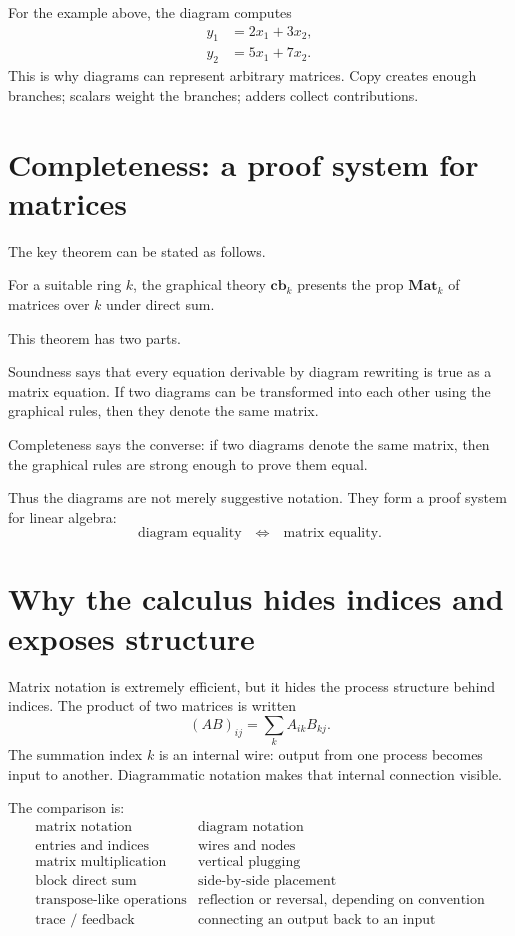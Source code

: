 For the example above, the diagram computes
\[
\begin{aligned}
  y_1&=2x_1+3x_2,\\
  y_2&=5x_1+7x_2.
\end{aligned}
\]
This is why diagrams can represent arbitrary matrices.  Copy creates enough branches; scalars weight the branches; adders collect contributions.

\section{Completeness: a proof system for matrices}

The key theorem can be stated as follows.

\begin{theorem}
For a suitable ring \(k\), the graphical theory \(\mathbf{cb}_k\) presents the prop \(\mathbf{Mat}_k\) of matrices over \(k\) under direct sum.
\end{theorem}

This theorem has two parts.

Soundness says that every equation derivable by diagram rewriting is true as a matrix equation.  If two diagrams can be transformed into each other using the graphical rules, then they denote the same matrix.

Completeness says the converse: if two diagrams denote the same matrix, then the graphical rules are strong enough to prove them equal.

Thus the diagrams are not merely suggestive notation.  They form a proof system for linear algebra:
\[
  \text{diagram equality}\quad \Longleftrightarrow\quad \text{matrix equality.}
\]

\section{Why the calculus hides indices and exposes structure}

Matrix notation is extremely efficient, but it hides the process structure behind indices.  The product of two matrices is written
\[
  (AB)_{ij}=\sum_k A_{ik}B_{kj}.
\]
The summation index \(k\) is an internal wire: output from one process becomes input to another.  Diagrammatic notation makes that internal connection visible.

The comparison is:
\[
\begin{array}{c|c}
\text{matrix notation} & \text{diagram notation}\\
\hline
\text{entries and indices} & \text{wires and nodes}\\
\text{matrix multiplication} & \text{vertical plugging}\\
\text{block direct sum} & \text{side-by-side placement}\\
\text{transpose-like operations} & \text{reflection or reversal, depending on convention}\\
\text{trace / feedback} & \text{connecting an output back to an input}
\end{array}
\]

